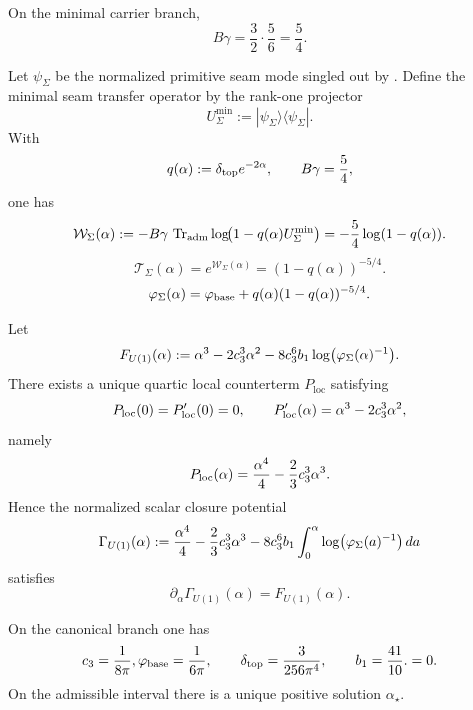 \begin{proposition}
\label{prop:carrier-susceptibility-exponent}
On the minimal carrier branch,
\[
B\gamma=\frac32\cdot\frac56=\frac54.
\]
\end{proposition}
\begin{definition}
\label{def:exact-seam-generating-function}
Let $\psi_{\Sigma}$ be the normalized primitive seam mode singled out by
. Define the minimal seam transfer operator by the rank-one
projector
\[
U_{\Sigma}^{\min}:=|\psi_{\Sigma}\rangle\langle\psi_{\Sigma}|.
\]
With
\[
q(\alpha):=\delta_{\mathrm{top}} e^{-2\alpha},
\qquad
B\gamma=\frac54,
\]
one has
\[
\mathcal W_{\Sigma}(\alpha)
:=
-B\gamma\,\operatorname{Tr}_{\mathrm{adm}}\log\!\bigl(1-q(\alpha)U_{\Sigma}^{\min}\bigr)
=-\frac54\log(1-q(\alpha)).
\]
\[
\mathcal T_{\Sigma}(\alpha)=e^{\mathcal W_{\Sigma}(\alpha)}=(1-q(\alpha))^{-5/4}.
\]
\begin{equation}
\label{eq:phi-opening}
\varphi_{\Sigma}(\alpha)=\varphi_{\mathrm{base}}+q(\alpha)(1-q(\alpha))^{-5/4}.
\end{equation}
\end{definition}

\begin{proposition}
\label{prop:log-det-variation-u1}
Let
\[
F_{U(1)}(\alpha):=\alpha^3-2c_3^3\alpha^2-8c_3^6 b_1\log\bigl(\varphi_{\Sigma}(\alpha)^{-1}\bigr).
\]
There exists a unique quartic local counterterm $P_{\mathrm{loc}}$ satisfying
\[
P_{\mathrm{loc}}(0)=P_{\mathrm{loc}}'(0)=0,
\qquad
P_{\mathrm{loc}}'(\alpha)=\alpha^3-2c_3^3\alpha^2,
\]
namely
\[
P_{\mathrm{loc}}(\alpha)=\frac{\alpha^4}{4}-\frac23c_3^3\alpha^3.
\]
Hence the normalized scalar closure potential
\[
\Gamma_{U(1)}(\alpha)
:=
\frac{\alpha^4}{4}-\frac23c_3^3\alpha^3
-8c_3^6 b_1\int_0^\alpha \log\bigl(\varphi_{\Sigma}(a)^{-1}\bigr)\,da
\]
satisfies
\[
\partial_{\alpha}\Gamma_{U(1)}(\alpha)=F_{U(1)}(\alpha).
\]
\end{proposition}


\iffalse
\begin{theorem}
\label{thm:exact-electromagnetic-closure}
\label{thm:alpha-canonical}
On the canonical branch one has
\[
c_3=\frac{1}{8\pi},
\varphi_{\mathrm{base}}=\frac{1}{6\pi},
\qquad
\delta_{\mathrm{top}}=\frac{3}{256\pi^4},
\qquad
b_1=\frac{41}{10}.
=0.
\]
On the admissible interval there is a unique positive solution $\alpha_\star$.
\end{theorem}

